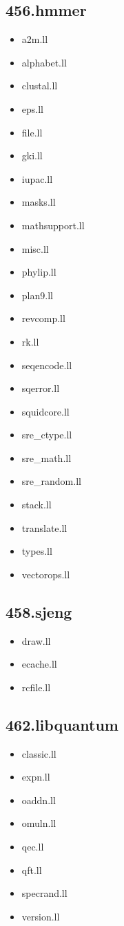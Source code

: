 \begin{multicols}{3}
	\subsection{456.hmmer}
	\begin{itemize}
		\item a2m.ll
		\item alphabet.ll
		\item clustal.ll
		\item eps.ll
		\item file.ll
		\item gki.ll
		\item iupac.ll
		\item masks.ll
		\item mathsupport.ll
		\item misc.ll
		\item phylip.ll
		\item plan9.ll
		\item revcomp.ll
		\item rk.ll
		\item seqencode.ll
		\item sqerror.ll
		\item squidcore.ll
		\item sre\_ctype.ll
		\item sre\_math.ll
		\item sre\_random.ll
		\item stack.ll
		\item translate.ll
		\item types.ll
		\item vectorops.ll
	\end{itemize}

	\subsection{458.sjeng}
	\begin{itemize}
		\item draw.ll
		\item ecache.ll
		\item rcfile.ll
	\end{itemize}

	\subsection{462.libquantum}
	\begin{itemize}
		\item classic.ll
		\item expn.ll
		\item oaddn.ll
		\item omuln.ll
		\item qec.ll
		\item qft.ll
		\item specrand.ll
		\item version.ll
	\end{itemize}


\end{multicols}
